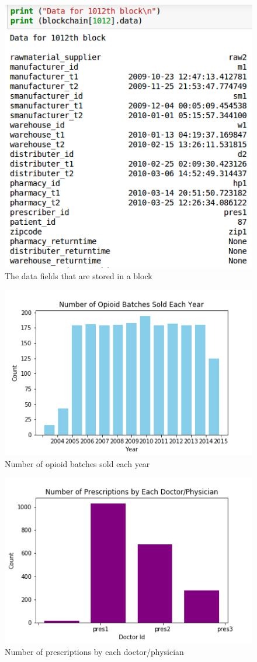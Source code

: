 \documentclass[sigconf]{acmart}
\begin{document}
\begin{figure}[!ht]
 \centering\includegraphics[width=0.75\columnwidth]{images/block_data.png}
  \caption{The data fields that are stored in a block}\label{f:datainablock}
\end{figure}

\begin{figure}[!ht]
 \centering\includegraphics[width=0.75\columnwidth]{images/yearly_batch_count_hist.png}
  \caption{Number of opioid batches sold each year}\label{f:yearlyhist}
\end{figure}

\begin{figure}[!ht]
 \centering\includegraphics[width=0.75\columnwidth]{images/prescriptions_hist.png}
  \caption{Number of prescriptions by each doctor/physician}\label{f:preshist}
\end{figure}
\end{document}
